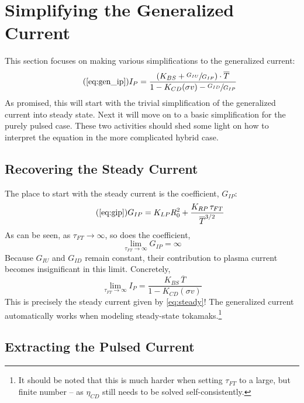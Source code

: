 \section{Simplifying the Generalized Current}

This section focuses on making various simplifications to the generalized current:
\begin{equation}
	\tag{\ref{eq:gen_ip}}
	I_P = \frac{ \left( K_{BS} + \sfrac{ G_{IU} }{ G_{IP} } \right) \cdot \overline T }{ 1 - K_{CD} ( \sigma v ) - \sfrac{ G_{ID} }{ G_{IP} } }
\end{equation}
As promised, this will start with the trivial simplification of the generalized current into steady state. Next it will move on to a basic simplification for the purely pulsed case. These two activities should shed some light on how to interpret the equation in the more complicated hybrid case.

\subsection{Recovering the Steady Current}

The place to start with the steady current is the  coefficient, $G_{IP}$:
\begin{equation}
	\tag{\ref{eq:gip}}
	G_{IP} = K_{LP} R_0^2 + \frac{ K_{RP} \, \tau_{FT} }{ \overline T ^ {3/2} }
\end{equation}
As can be seen, as $\tau_{FT} \to \infty$, so does the coefficient,
\begin{equation}
	\lim_{\tau_{FT} \to \infty} G_{IP} = \infty
\end{equation}
Because $G_{IU}$ and $G_{ID}$ remain constant, their contribution to plasma current becomes insignificant in this limit. Concretely,
\begin{equation}
	\label{eq:tau_inf}
	\lim_{\tau_{FT} \to \infty} I_P = \frac{ K_{BS} \, \overline T }{ 1 - K_{CD} ( \sigma v ) }
\end{equation}
This is precisely the steady current given by \cref{eq:steady}! The generalized current automatically works when modeling steady-state tokamaks.\footnote{It should be noted that this is much harder when setting $\tau_{FT}$ to a large, but finite number -- as $\eta_{CD}$ still needs to be solved self-consistently. }

\subsection{Extracting the Pulsed Current}


